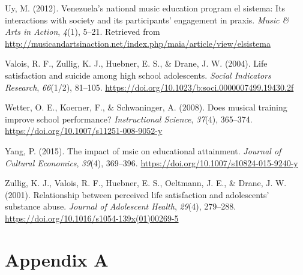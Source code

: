 \documentclass[a4, 12pt]{article}
\begin{document}
\leavevmode\hypertarget{ref-Uy2012}{}%
Uy, M. (2012). Venezuela's national music education program el sistema: Its interactions with society and its participants' engagement in praxis. \emph{Music \& Arts in Action}, \emph{4}(1), 5--21. Retrieved from \url{http://musicandartsinaction.net/index.php/maia/article/view/elsistema}

\leavevmode\hypertarget{ref-Valois2004}{}%
Valois, R. F., Zullig, K. J., Huebner, E. S., \& Drane, J. W. (2004). Life satisfaction and suicide among high school adolescents. \emph{Social Indicators Research}, \emph{66}(1/2), 81--105. \url{https://doi.org/10.1023/b:soci.0000007499.19430.2f}

\leavevmode\hypertarget{ref-Wetter2008}{}%
Wetter, O. E., Koerner, F., \& Schwaninger, A. (2008). Does musical training improve school performance? \emph{Instructional Science}, \emph{37}(4), 365--374. \url{https://doi.org/10.1007/s11251-008-9052-y}

\leavevmode\hypertarget{ref-Yang2015}{}%
Yang, P. (2015). The impact of msic on educational attainment. \emph{Journal of Cultural Economics}, \emph{39}(4), 369--396. \url{https://doi.org/10.1007/s10824-015-9240-y}

\leavevmode\hypertarget{ref-Zullig2001}{}%
Zullig, K. J., Valois, R. F., Huebner, E. S., Oeltmann, J. E., \& Drane, J. W. (2001). Relationship between perceived life satisfaction and adolescents' substance abuse. \emph{Journal of Adolescent Health}, \emph{29}(4), 279--288. \url{https://doi.org/10.1016/s1054-139x(01)00269-5}

\clearpage

\hypertarget{appendix-appendix}{%
\appendix}


\hypertarget{appendix-a}{%
\section{Appendix A}\label{appendix-a}}
\end{document}
